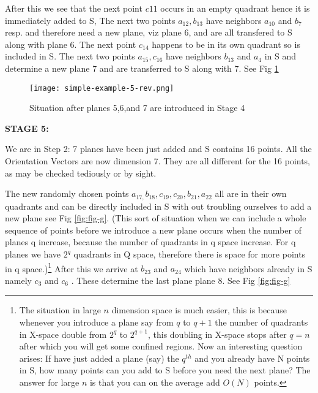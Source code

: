 \documentclass[english]{article}
\begin{document}
After this we see that the next point $c11$ occurs in an empty quadrant
hence it is immediately added to S, The next two points $a_{12},b_{13}$
have neighbors $a_{10}$ and $b_7$ resp. and therefore need a new plane, viz plane 6, and are all transfered to
S along with plane 6. The next point $c_{14}$ happens to be in its
own quadrant so is included in S. The next two points $a_{15},c_{16}$
have neighbors $b_{13}$ and $a_4$ in S and determine a new plane 7 and are transferred
to S along with 7. See Fig \ref{fig:fig-f}


\begin{figure}[htp]
 \begin{center}
 
\texttt{[image: simple-example-5-rev.png]}
\caption{Situation after planes 5,6,and 7 are introduced in Stage 4}

\label{fig:fig-f} \end{center}
\end{figure} 



\medskip{}
\medskip{}


\textbf{STAGE 5:}

We are in Step 2: 7 planes have been just added and S contains 16
points. All the Orientation Vectors are now dimension 7. They are
all different for the 16 points, as may be checked tediously or by
sight.

The new randomly chosen points $a_{17,}b_{18},c_{19},c_{20},b_{21},a_{22}$
all are in their own quadrants and can be directly included in S with
out troubling ourselves to add a new plane see Fig \ref{fig:fig-g}. (This sort of situation
when we can include a whole sequence of points before we introduce
a new plane occurs when the number of planes q increase, because
the number of quadrants in q space increase. For q planes we have
$2^{q}$ quadrants in Q space, therefore there is space for more points
in q space.)\footnote{ The situation in large $n$ dimension space is much easier, this is because whenever you introduce a plane say from $q$ to $q+1$ the number of quadrants in X-space double from $2^q$ to $2^{q+1}$, this doubling in X-space stops after $q=n$ after which you will get some confined regions. Now an interesting question arises: If have just added a plane (say) the $q^{th}$ and you already have N points in S, how many points can you add to S before you need the next plane? The answer for large $n$ is that you can on the average add $O(N)$ points.}
 After this we arrive at $b_{23}$ and $a_{24}$ which
have neighbors already in S namely $c_{3}$ and $c_{6}$ . These determine
the last plane plane 8. See Fig \ref{fig:fig-g}
\end{document}
